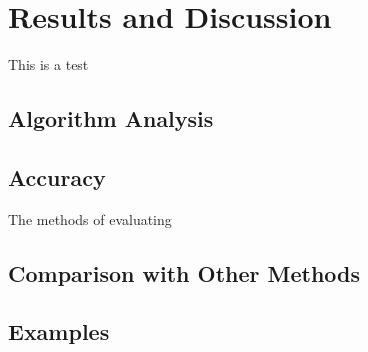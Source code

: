 
\chapter{Results and Discussion}\label{chap:results}

This is a test


\section{Algorithm Analysis}

\section{Accuracy}

The methods of evaluating

\section{Comparison with Other Methods}

\section{Examples}
